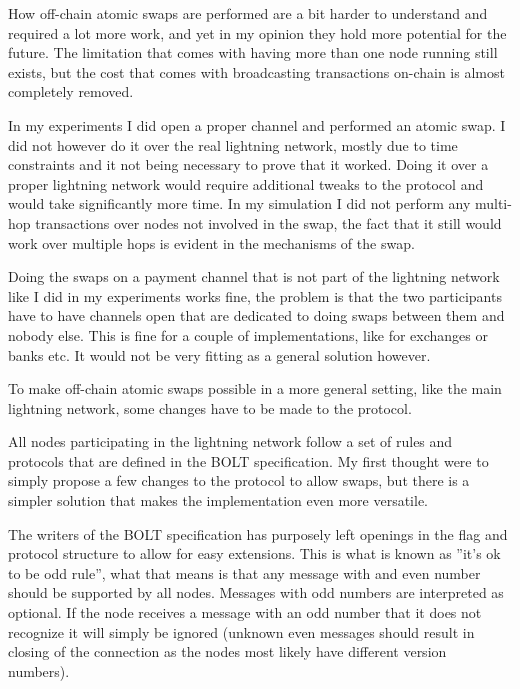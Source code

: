 How off-chain atomic swaps are performed are a bit harder to understand and 
required a lot more work, and yet in my opinion they hold more potential for 
the future. The limitation that comes with having more than one node running 
still exists, but the cost that comes with broadcasting transactions on-chain 
is almost completely removed. 

In my experiments I did open a proper channel and performed an atomic swap. 
I did not however do it over the real lightning  network, mostly due to time 
constraints and it not being necessary to prove that it worked. Doing it over 
a proper lightning network would require additional tweaks to the protocol and 
would take significantly more time. In my simulation I did not perform any 
multi-hop transactions over nodes not involved in the swap, the fact that it
still would work over multiple hops is evident in the mechanisms of the swap.

Doing the swaps on a payment channel that is not part of the lightning network
like I did in my experiments works fine, the problem is that the two participants
have to have channels open that are dedicated to doing swaps between them and nobody
else. This is fine for a couple of implementations, like for exchanges or banks 
etc. It would not be very fitting as a general solution however. 

To make off-chain atomic swaps possible in a more general setting, like the main
lightning network, some changes have to be made to the protocol. 

All nodes participating in the lightning network follow a set of rules and 
protocols that are defined in the BOLT specification. My first thought were to
simply propose a few changes to the protocol to allow swaps, but there is a 
simpler solution that makes the implementation even more versatile. 

The writers of the BOLT specification has purposely left openings in the
flag and protocol structure to allow for easy extensions. This is what is known
as ''it's ok to be odd rule'', what that means is that any  message with
and even number should be supported by all nodes. Messages with odd numbers 
are interpreted as optional. If the node receives a message with an odd number 
that it does not recognize it will simply be ignored (unknown even messages 
should result in closing of the connection as the nodes most likely
have different version numbers).


